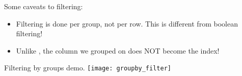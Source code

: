 \documentclass[openany]{book}
\begin{document}
\begin{warn}
	Some caveats to filtering:
	\begin{itemize}
		\item Filtering is done per group, not per row. This is different from boolean filtering!
		\item Unlike , the column we grouped on does NOT become the index!
	\end{itemize}
\end{warn}

\begin{figurebox}[]{Filtering by groups demo.}
	\centering\texttt{[image: groupby\_filter]}
\end{figurebox}
\end{document}
